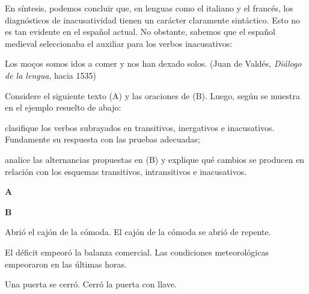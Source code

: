 \begin{recuadro}
En síntesis, podemos concluir que, en lenguas como el italiano y el francés, los
diagnósticos de inacusatividad tienen un carácter claramente sintáctico. Esto no
es tan evidente en el español actual. No obstante, sabemos que el español
medieval seleccionaba el auxiliar  para los verbos inacusativos:

\begin{exe}
  \ex Los moços somos idos a comer y nos han dexado solos. (Juan de Valdés,
      \textit{Diálogo de la lengua}, hacia 1535)\\
\end{exe}
\end{recuadro}

\begin{ejercicio}\label{ej:07-inacusativos}
Considere el siguiente texto (A) y las oraciones de (B). Luego, según se muestra
en el ejemplo resuelto de abajo:

\begin{consignas}
  \item clasifique los verbos subrayados en transitivos, inergativos e
        inacusativos. Fundamente su respuesta con las pruebas adecuadas;
  \item analice las alternancias propuestas en (B) y explique qué cambios se
        producen en relación con los esquemas transitivos, intransitivos e
        inacusativos.
\end{consignas}

\textbf{A}


\textbf{B}

\begin{exe}
  \ex
    \begin{xlist}
      \ex Abrió el cajón de la cómoda.
      \ex El cajón de la cómoda se abrió de repente.
    \end{xlist}
  \ex
    \begin{xlist}
      \ex El déficit empeoró la balanza comercial.
      \ex Las condiciones meteorológicas empeoraron en las últimas horas.
    \end{xlist}
  \ex
    \begin{xlist}
      \ex Una puerta se cerró.
      \ex Cerró la puerta con llave.
    \end{xlist}
\end{exe}


\end{ejercicio}
